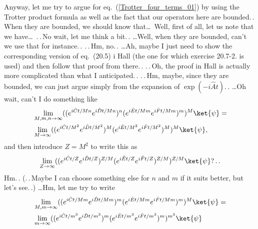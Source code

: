 \documentclass{report}
\begin{document}
Anyway, let me try to argue for eq.\ (\ref{Trotter_four_terms_01}) by using the Trotter product formula as well as the fact that our operators here are bounded.\,. When they are bounded, we should know that\ldots\ Well, first of all, let us note that we have\ldots\ .\,.\,No wait, let me think a bit.\,. 
\ldots Well, when they are bounded, can't we use that for instance.\,. .\,.\,Hm, no.\,. 
\ldots Ah, maybe I just need to show the corresponding version of eq.\ (20.5) i Hall (the one for which exercise 20.7-2. is used) and then follow that proof from there.\,. .\,.\,Oh, the proof in Hall is actually more complicated than what I anticipated.\,. .\,.\,Hm, maybe, since they are bounded, we can just argue simply from the expansion of $\exp(-i \hat A t)$.\,.  \ldots Oh wait, can't I do something like
\begin{align}
\begin{aligned}
	&\lim_{M, m, n \to \infty} (
		(e^{i \hat C t / M n} e^{i \hat D t / M n})^n
		(e^{i \hat E t / M m} e^{i \hat F t / M m})^m
	)^M \ket{\psi} = \\
	&\lim_{M \to \infty} (
		(e^{i \hat C t / M^2} e^{i \hat D t / M^2})^M
		(e^{i \hat E t / M^2} e^{i \hat F t / M^2})^M
	)^M \ket{\psi},
\end{aligned}
\end{align} 
and then introduce $Z=M^2$ to write this as
\begin{align}
\begin{aligned}
	\lim_{Z \to \infty} (
		(e^{i \hat C t / Z} e^{i \hat D t / Z})^{Z/M}
		(e^{i \hat E t / Z} e^{i \hat F t / Z})^{Z/M}
	)^{Z/M} \ket{\psi}?\,.\,.
\end{aligned}
\end{align} 
Hm.\,. (.\,.\,Maybe I can choose something else for $n$ and $m$ if it suits better, but let's see.\,.)
\ldots Hm, let me try to write
\begin{align}
\begin{aligned}
	&\lim_{M, m \to \infty} (
		(e^{i \hat C t / M m} e^{i \hat D t / M m})^m
		(e^{i \hat E t / M m} e^{i \hat F t / M m})^m
	)^M \ket{\psi} = \\
	&\lim_{m \to \infty} (
		(e^{i \hat C t / m^3} e^{i \hat D t / m^3})^m
		(e^{i \hat E t / m^3} e^{i \hat F t / m^3})^m
	)^{m^3} \ket{\psi}
\end{aligned}
\end{align} 
\end{document}
